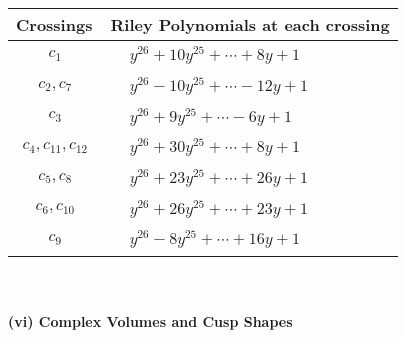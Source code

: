 \documentclass[1p]{elsarticle_modified}
\theoremstyle{definition}
\begin{document}
\begin{tabular}{m{50pt}|m{274pt}}
Crossings & \hspace{64pt}Riley Polynomials at each crossing \\
\hline $$\begin{aligned}c_{1}\end{aligned}$$&$\begin{aligned}
&y^{26}+10 y^{25}+\cdots+8 y+1
\end{aligned}$\\
\hline $$\begin{aligned}c_{2},c_{7}\end{aligned}$$&$\begin{aligned}
&y^{26}-10 y^{25}+\cdots-12 y+1
\end{aligned}$\\
\hline $$\begin{aligned}c_{3}\end{aligned}$$&$\begin{aligned}
&y^{26}+9 y^{25}+\cdots-6 y+1
\end{aligned}$\\
\hline $$\begin{aligned}c_{4},c_{11},c_{12}\end{aligned}$$&$\begin{aligned}
&y^{26}+30 y^{25}+\cdots+8 y+1
\end{aligned}$\\
\hline $$\begin{aligned}c_{5},c_{8}\end{aligned}$$&$\begin{aligned}
&y^{26}+23 y^{25}+\cdots+26 y+1
\end{aligned}$\\
\hline $$\begin{aligned}c_{6},c_{10}\end{aligned}$$&$\begin{aligned}
&y^{26}+26 y^{25}+\cdots+23 y+1
\end{aligned}$\\
\hline $$\begin{aligned}c_{9}\end{aligned}$$&$\begin{aligned}
&y^{26}-8 y^{25}+\cdots+16 y+1
\end{aligned}$\\
\hline
\end{tabular}\\~\\
\newpage\flushleft \textbf{(vi) Complex Volumes and Cusp Shapes}
\end{document}
